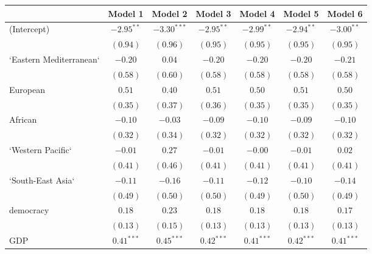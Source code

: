 
\begin{table}[!h]
\begin{center}
\begin{tabular}{l c c c c c c }
\toprule
 & Model 1 & Model 2 & Model 3 & Model 4 & Model 5 & Model 6 \\
\midrule
(Intercept)             & $-2.95^{**}$ & $-3.30^{***}$ & $-2.95^{**}$ & $-2.99^{**}$ & $-2.94^{**}$ & $-3.00^{**}$ \\
                        & $(0.94)$     & $(0.96)$      & $(0.95)$     & $(0.95)$     & $(0.95)$     & $(0.95)$     \\
`Eastern Mediterranean` & $-0.20$      & $0.04$        & $-0.20$      & $-0.20$      & $-0.20$      & $-0.21$      \\
                        & $(0.58)$     & $(0.60)$      & $(0.58)$     & $(0.58)$     & $(0.58)$     & $(0.58)$     \\
European                & $0.51$       & $0.40$        & $0.51$       & $0.50$       & $0.51$       & $0.50$       \\
                        & $(0.35)$     & $(0.37)$      & $(0.36)$     & $(0.35)$     & $(0.35)$     & $(0.35)$     \\
African                 & $-0.10$      & $-0.03$       & $-0.09$      & $-0.10$      & $-0.09$      & $-0.10$      \\
                        & $(0.32)$     & $(0.34)$      & $(0.32)$     & $(0.32)$     & $(0.32)$     & $(0.32)$     \\
`Western Pacific`       & $-0.01$      & $0.27$        & $-0.01$      & $-0.00$      & $-0.01$      & $0.02$       \\
                        & $(0.41)$     & $(0.46)$      & $(0.41)$     & $(0.41)$     & $(0.41)$     & $(0.41)$     \\
`South-East Asia`       & $-0.11$      & $-0.16$       & $-0.11$      & $-0.12$      & $-0.10$      & $-0.14$      \\
                        & $(0.49)$     & $(0.50)$      & $(0.50)$     & $(0.49)$     & $(0.50)$     & $(0.49)$     \\
democracy               & $0.18$       & $0.23$        & $0.18$       & $0.18$       & $0.18$       & $0.17$       \\
                        & $(0.13)$     & $(0.15)$      & $(0.13)$     & $(0.13)$     & $(0.13)$     & $(0.13)$     \\
GDP                     & $0.41^{***}$ & $0.45^{***}$  & $0.42^{***}$ & $0.41^{***}$ & $0.42^{***}$ & $0.41^{***}$ \\

\end{tabular}
\end{center}
\end{table}
